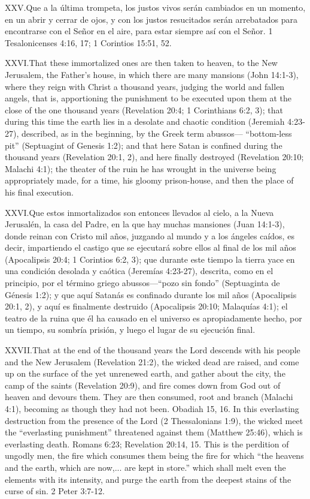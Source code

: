 \lettrine{XXV.} Que a la última trompeta, los justos vivos serán cambiados en un momento, en un abrir y cerrar de ojos, y con los justos resucitados serán arrebatados para encontrarse con el Señor en el aire, para estar siempre así con el Señor. 1 Tesalonicenses 4:16, 17; 1 Corintios 15:51, 52.


\lettrine{XXVI.} That these immortalized ones are then taken to heaven, to the New Jerusalem, the Father’s house, in which there are many mansions (John 14:1-3), where they reign with Christ a thousand years, judging the world and fallen angels, that is, apportioning the punishment to be executed upon them at the close of the one thousand years (Revelation 20:4; 1 Corinthians 6:2, 3); that during this time the earth lies in a desolate and chaotic condition (Jeremiah 4:23-27), described, as in the beginning, by the Greek term abussos— “bottom-less pit” (Septuagint of Genesis 1:2); and that here Satan is confined during the thousand years (Revelation 20:1, 2), and here finally destroyed (Revelation 20:10; Malachi 4:1); the theater of the ruin he has wrought in the universe being appropriately made, for a time, his gloomy prison-house, and then the place of his final execution.


\lettrine{XXVI.} Que estos inmortalizados son entonces llevados al cielo, a la Nueva Jerusalén, la casa del Padre, en la que hay muchas mansiones (Juan 14:1-3), donde reinan con Cristo mil años, juzgando al mundo y a los ángeles caídos, es decir, impartiendo el castigo que se ejecutará sobre ellos al final de los mil años (Apocalipsis 20:4; 1 Corintios 6:2, 3); que durante este tiempo la tierra yace en una condición desolada y caótica (Jeremías 4:23-27), descrita, como en el principio, por el término griego abussos—“pozo sin fondo” (Septuaginta de Génesis 1:2); y que aquí Satanás es confinado durante los mil años (Apocalipsis 20:1, 2), y aquí es finalmente destruido (Apocalipsis 20:10; Malaquías 4:1); el teatro de la ruina que él ha causado en el universo es apropiadamente hecho, por un tiempo, su sombría prisión, y luego el lugar de su ejecución final.


\lettrine{XXVII.} That at the end of the thousand years the Lord descends with his people and the New Jerusalem (Revelation 21:2), the wicked dead are raised, and come up on the surface of the yet unrenewed earth, and gather about the city, the camp of the saints (Revelation 20:9), and fire comes down from God out of heaven and devours them. They are then consumed, root and branch (Malachi 4:1), becoming as though they had not been. Obadiah 15, 16. In this everlasting destruction from the presence of the Lord (2 Thessalonians 1:9), the wicked meet the “everlasting punishment” threatened against them (Matthew 25:46), which is everlasting death. Romans 6:23; Revelation 20:14, 15. This is the perdition of ungodly men, the fire which consumes them being the fire for which “the heavens and the earth, which are now,... are kept in store.” which shall melt even the elements with its intensity, and purge the earth from the deepest stains of the curse of sin. 2 Peter 3:7-12.


